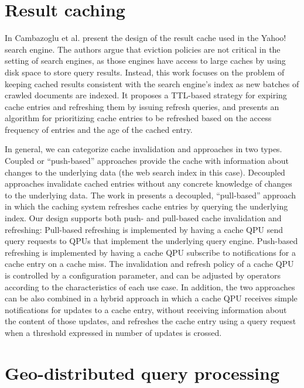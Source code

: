\section{Result caching}
\label{sec:related_caching}
In \cite{cambazoglu:yahoorefreshing} Cambazoglu et al. present the design of the result cache used
in the Yahoo! search engine.
The authors argue that eviction policies are not critical in the setting of search engines, as those engines have access
to large caches by using disk space to store query results.
Instead, this work focuses on the problem of keeping cached results consistent with the search engine’s index
as new batches of crawled documents are indexed.
It proposes a TTL-based strategy for expiring cache entries and refreshing them by issuing refresh queries,
and presents an algorithm for prioritizing cache entries to be refreshed based on the access frequency of entries and
the age of the cached entry.

In general, we can categorize cache invalidation and approaches in two types.
Coupled or ``push-based'' approaches provide the cache with information about changes to the underlying data
(the web search index in this case).
Decoupled approaches invalidate cached entries without any concrete knowledge of changes to the underlying data.
The work in \cite{cambazoglu:yahoorefreshing} presents a decoupled,
``pull-based'' approach in which the caching system refreshes cache entries by querying the underlying index.
Our design supports both push- and pull-based cache invalidation and refreshing:
Pull-based refreshing is implemented by having a cache QPU send query requests to QPUs that implement the underlying
query engine.
Push-based refreshing is implemented by having a cache QPU subscribe to notifications for a cache entry on a cache
miss.
The invalidation and refresh policy of a cache QPU is controlled by a configuration parameter,
and can be adjusted by operators according to the characteristics of each use case.
In addition, the two approaches can be also combined in a hybrid approach in which a cache QPU receives simple notifications
for updates to a cache entry, without receiving information about the content of those updates,
and refreshes the cache entry using a query request when a threshold expressed in number of updates is crossed.

\section{Geo-distributed query processing}
\label{sec:federation}

